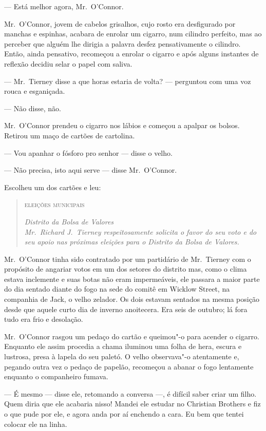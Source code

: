 --- Está melhor agora, Mr.~O’Connor.

Mr.~O’Connor, jovem de cabelos grisalhos, cujo rosto era desfigurado por
manchas e espinhas, acabara de enrolar um cigarro, num cilindro perfeito, mas
ao perceber que alguém lhe dirigia a palavra desfez pensativamente o cilindro.
Então, ainda pensativo, recomeçou a enrolar o cigarro e após alguns instantes
de reflexão decidiu selar o papel com saliva.

--- Mr.~Tierney disse a que horas estaria de volta? --- perguntou com uma voz
rouca e esganiçada.

--- Não disse, não.

Mr.~O’Connor prendeu o cigarro nos lábios e começou a apalpar os bolsos.
Retirou um maço de cartões de cartolina.

--- Vou apanhar o fósforo pro senhor --- disse o velho.

--- Não precisa, isto aqui serve --- disse Mr.~O’Connor.

Escolheu um dos cartões e leu:


\begin{quote}\centering
\textsc{eleições municipais}\smallskip

\textit{Distrito da Bolsa de Valores}\\
\textit{Mr.~Richard J.~Tierney respeitosamente solicita o favor do
seu voto e do seu apoio nas próximas eleições para o Distrito da
Bolsa de Valores.}
\end{quote}

Mr.~O’Connor tinha sido contratado por um partidário de Mr.~Tierney com o
propósito de angariar votos em um dos setores do distrito mas, como o clima
estava inclemente e suas botas não eram impermeáveis, ele passara a maior parte
do dia sentado diante do fogo na sede do comitê em Wicklow Street, na companhia
de Jack, o velho zelador.  Os dois estavam sentados na mesma posição desde que
aquele curto dia de inverno anoitecera.  Era seis de outubro; lá fora tudo era
frio e desolação.

Mr.~O’Connor rasgou um pedaço do cartão e queimou"-o para acender o cigarro.
Enquanto ele assim procedia a chama iluminou uma folha de hera, escura e
lustrosa, presa à lapela do seu paletó.  O velho observava"-o atentamente e,
pegando outra vez o pedaço de papelão, recomeçou a abanar o fogo lentamente
enquanto o companheiro fumava.

--- É mesmo --- disse ele, retomando a conversa ---, é difícil saber criar um
filho.  Quem diria que ele acabaria nisso!  Mandei ele estudar no Christian
Brothers e fiz o que pude por ele, e agora anda por aí enchendo a cara.  Eu bem
que tentei colocar ele na linha.


